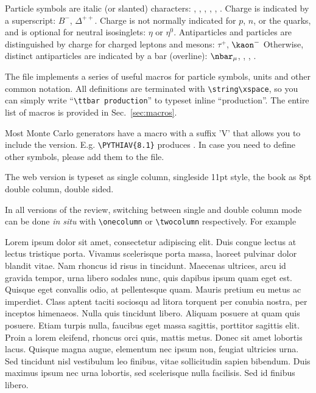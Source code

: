 Particle symbols are italic (or slanted) characters: \en, \pbar, \Lb, \pizero, \Klong, \Dstar. 
Charge is indicated by a superscript: $B^{-}$, $\Delta^{++}$. 
Charge is not normally indicated for $p$, $n$, or the quarks, and is optional for neutral isosinglets: $\eta$ or $\eta^{0}$. 
Antiparticles and particles are distinguished by charge for
charged leptons and mesons: $\tau^{+}$, $\kaon^{-}$ 
Otherwise, distinct antiparticles are indicated by a bar (overline): $\nbar_{\mu}$, \tbar, \pbar, \Kzerobar.

The  file implements a series of useful macros for particle symbols, units and other common notation. 
All definitions are terminated with  \lstinline!\string\xspace!, so you can simply write ``\lstinline!\ttbar production!'' to typeset inline ``\ttbar production''.
The entire list of macros is provided in Sec.~\ref{sec:macros}.

Most Monte Carlo generators have a macro with a suffix 'V' that allows you to include the version. E.g. \lstinline!\PYTHIAV{8.1}! produces .
In case you need to define other symbols, please add them to the  file.


The web version is typeset as single column, singleside 11pt style, the book as 8pt double column, double sided.

In all versions of the review, switching between single and double column mode can be done \emph{in situ} with \lstinline{\onecolumn} or \lstinline{\twocolumn}
respectively. For example

\medskip
\ifrppbook
	\onecolumn
\else
	\twocolumn
\fi
{\footnotesize{Lorem ipsum dolor sit amet, consectetur adipiscing elit. Duis congue lectus at lectus tristique porta. Vivamus scelerisque porta massa, laoreet pulvinar dolor blandit vitae. Nam rhoncus id risus in tincidunt. Maecenas ultrices, arcu id gravida tempor, urna libero sodales nunc, quis dapibus ipsum quam eget est. Quisque eget convallis odio, at pellentesque quam. Mauris pretium eu metus ac imperdiet. Class aptent taciti sociosqu ad litora torquent per conubia nostra, per inceptos himenaeos. Nulla quis tincidunt libero. Aliquam posuere at quam quis posuere. Etiam turpis nulla, faucibus eget massa sagittis, porttitor sagittis elit. Proin a lorem eleifend, rhoncus orci quis, mattis metus. Donec sit amet lobortis lacus. Quisque magna augue, elementum nec ipsum non, feugiat ultricies urna. Sed tincidunt nisl vestibulum leo finibus, vitae sollicitudin sapien bibendum. Duis maximus ipsum nec urna lobortis, sed scelerisque nulla facilisis. Sed id finibus libero. }}
\ifrppbook
	\twocolumn
\else
	\onecolumn
\fi
\medskip

